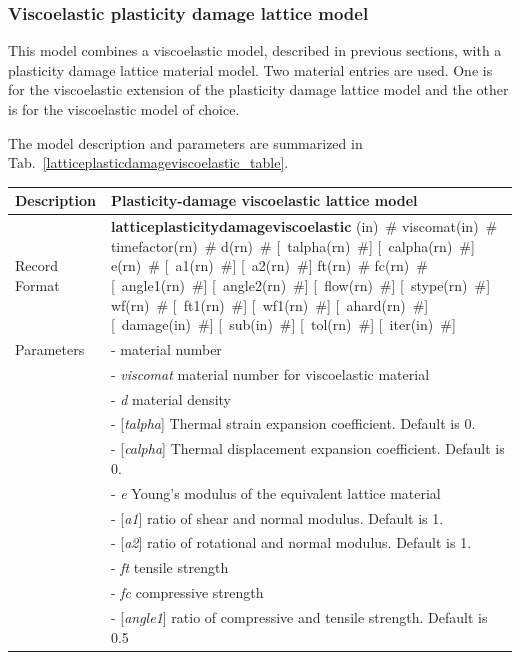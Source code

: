 \documentclass[a4paper]{article}
\newcommand{\descitem}[1]{{\noindent \bf #1}}
\newcommand{\elemparam}[2]{{{#1\tiny (#2)}~\#}}
\newcommand{\optelemparam}[2]{[{~\elemparam{#1}{#2}}]}
\newcommand{\param}[1]{{\it #1}}
\newcommand{\optparam}[1]{[{\it #1}]}
\newenvironment{mmt}{\begin{tabular}{|l|p{9cm}|}}{\end{tabular}\\}
\newenvironment{mmt}{\begin{tabular}{|l|l|}}{\end{tabular}\\}
\begin{document}
\subsubsection{Viscoelastic plasticity damage lattice model}

This model combines a viscoelastic model, described in previous sections, with a plasticity damage lattice material model. Two material entries are used. One is for the viscoelastic extension of the plasticity damage lattice model and the other is for the viscoelastic model of choice. 

The model description and parameters are summarized in Tab.~\ref{latticeplasticdamageviscoelastic_table}.

\begin{table}[!htb]
\begin{mmt}
\hline
Description & Plasticity-damage viscoelastic lattice model\\
\hline
Record Format & \descitem{latticeplasticitydamageviscoelastic} \elemparam{}{in} 
\elemparam{viscomat}{in} \elemparam{timefactor}{rn} \elemparam{d}{rn} \optelemparam{talpha}{rn} \optelemparam{calpha}{rn} \elemparam{e}{rn} \optelemparam{a1}{rn} \optelemparam{a2}{rn}  \elemparam{ft}{rn}  \elemparam{fc}{rn} \optelemparam{angle1}{rn}  \optelemparam{angle2}{rn} \optelemparam{flow}{rn} \optelemparam{stype}{rn} \elemparam{wf}{rn} \optelemparam{ft1}{rn} \optelemparam{wf1}{rn}  \optelemparam{ahard}{rn} \optelemparam{damage}{in}  \optelemparam{sub}{in}  \optelemparam{tol}{rn}  \optelemparam{iter}{in}\\
Parameters &- \param{} material number\\
&- \param{viscomat} material number for viscoelastic material\\
&- \param{d} material density\\
&- \optparam{talpha} Thermal strain expansion coefficient. Default is 0.\\
&- \optparam{calpha} Thermal displacement expansion coefficient. Default is 0.\\
&- \param{e} Young's modulus of the equivalent lattice material\\
&- \optparam{a1} ratio of shear and normal modulus. Default is 1.\\
&- \optparam{a2} ratio of rotational and normal modulus. Default is 1.\\
&- \param{ft} tensile strength\\
&- \param{fc} compressive strength\\
&- \optparam{angle1} ratio of compressive and tensile strength. Default is 0.5\\

\end{mmt}
\end{table}
\end{document}

